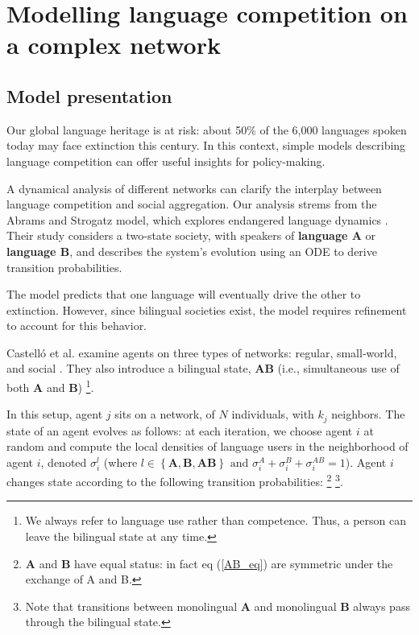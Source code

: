 \chapter{Modelling language competition on a complex network}

\section{Model presentation}

Our global language heritage is at risk: about 50\% of the 6,000 languages spoken today may face extinction this century. In this context, simple models describing language competition can offer useful insights for policy-making.

A dynamical analysis of different networks can clarify the interplay between language competition and social aggregation. Our analysis strems from the Abrams and Strogatz model, which explores endangered language dynamics \cite{Ambrams2003}. Their study considers a two-state society, with speakers of \textbf{language A} or \textbf{language B}, and describes the system's evolution using an ODE to derive transition probabilities.

The model predicts that one language will eventually drive the other to extinction. However, since bilingual societies exist, the model requires refinement to account for this behavior.

Castelló et al. \cite{Castello2008} examine agents on three types of networks: regular, small-world, and social \cite{Toivonen2006}. They also introduce a bilingual state, \textbf{AB} (i.e., simultaneous use of both \textbf{A} and \textbf{B}) \footnote{We always refer to language use rather than competence. Thus, a person can leave the bilingual state at any time.}.

In this setup, agent \( j \) sits on a network, of \( N \) individuals, with \( k_j \) neighbors. The state of an agent evolves as follows: at each iteration, we choose agent \( i \) at random and compute the local densities of language users in the neighborhood of agent \( i \), denoted \( \sigma_i^l \) (where \( l \in \left\{ \textbf{A},\textbf{B},\textbf{AB}\right\} \text{ and } \sigma_i^A+\sigma_i^B+\sigma_i^{AB}=1 \)). Agent \( i \) changes state according to the following transition probabilities: \footnote{\textbf{A} and \textbf{B} have equal status: in fact eq (\ref{AB_eq}) are symmetric under the exchange of A and B.} \footnote{Note that transitions between monolingual \textbf{A} and monolingual \textbf{B} always pass through the bilingual state.}.


